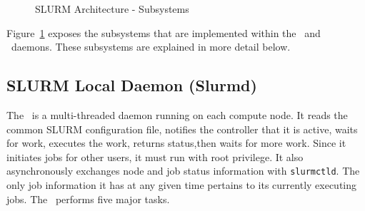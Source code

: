 %

\begin{figure}[tb]
\centerline{}
\caption{SLURM Architecture - Subsystems}
\label{archdetail}
\end{figure}

Figure~\ref{archdetail} exposes the subsystems that are implemented
within the \slurmd\ and \slurmctld\ daemons.  These subsystems
are explained in more detail below.

\subsection{SLURM Local Daemon (Slurmd)}

The \slurmd\ is a multi-threaded daemon running on each compute node.
It reads the common SLURM configuration file, 
notifies the controller that it is active, waits for work, 
executes the work, returns status,then waits for more work.  
Since it initiates jobs for other users, it must run with root privilege.
It also asynchronously exchanges node and job status information with {\tt slurmctld}.  
The only job information it has at any given time pertains to its 
currently executing jobs.
The \slurmd\ performs five major tasks.

